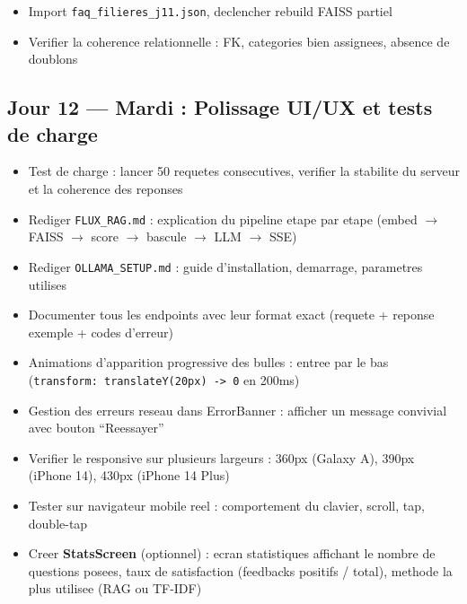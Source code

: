 \documentclass[11pt,a4paper]{article}
\begin{document}
\begin{dbbox}
\begin{itemize}
    \item[$\square$] Import \texttt{faq\_filieres\_j11.json}, declencher rebuild FAISS partiel
    \item[$\square$] Verifier la coherence relationnelle : FK, categories bien assignees, absence de doublons
\end{itemize}
\end{dbbox}

\subsection{Jour 12 --- Mardi : Polissage UI/UX et tests de charge}

\begin{ragbox}[Backend --- J12]
\begin{itemize}
    \item[$\square$] Test de charge : lancer 50 requetes consecutives, verifier la stabilite du serveur et la coherence des reponses
    \item[$\square$] Rediger \texttt{FLUX\_RAG.md} : explication du pipeline etape par etape (embed $\rightarrow$ FAISS $\rightarrow$ score $\rightarrow$ bascule $\rightarrow$ LLM $\rightarrow$ SSE)
    \item[$\square$] Rediger \texttt{OLLAMA\_SETUP.md} : guide d'installation, demarrage, parametres utilises
    \item[$\square$] Documenter tous les endpoints avec leur format exact (requete + reponse exemple + codes d'erreur)
\end{itemize}
\end{ragbox}

\begin{reactbox}[Frontend --- J12]
\begin{itemize}
    \item[$\square$] Animations d'apparition progressive des bulles : entree par le bas (\texttt{transform: translateY(20px) -> 0} en 200ms)
    \item[$\square$] Gestion des erreurs reseau dans ErrorBanner : afficher un message convivial avec bouton ``Reessayer''
    \item[$\square$] Verifier le responsive sur plusieurs largeurs : 360px (Galaxy A), 390px (iPhone 14), 430px (iPhone 14 Plus)
    \item[$\square$] Tester sur navigateur mobile reel : comportement du clavier, scroll, tap, double-tap
    \item[$\square$] Creer \textbf{StatsScreen} (optionnel) : ecran statistiques affichant le nombre de questions posees, taux de satisfaction (feedbacks positifs / total), methode la plus utilisee (RAG ou TF-IDF)
\end{itemize}
\end{reactbox}
\end{document}
